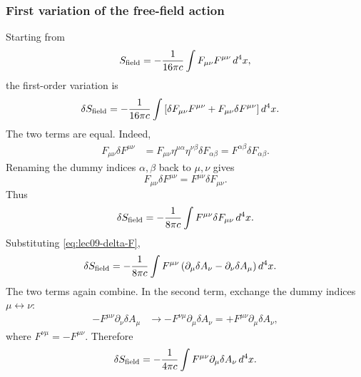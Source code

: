 \subsubsection*{First variation of the free-field action}

Starting from
\begin{equation}\label{eq:lec09-Sf-start}
  S_{\rm field}
  =
  -\frac{1}{16\pi c}\int F_{\mu\nu}F^{\mu\nu}\,d^4x ,
\end{equation}
the first-order variation is
\begin{align}
  \delta S_{\rm field}
  &=
  -\frac{1}{16\pi c}\int
  \left[
    \delta F_{\mu\nu}F^{\mu\nu}
    +F_{\mu\nu}\delta F^{\mu\nu}
  \right]d^4x .
  \label{eq:lec09-dSf-two-terms}
\end{align}
The two terms are equal.  Indeed,
\begin{align}
  F_{\mu\nu}\delta F^{\mu\nu}
  &=
  F_{\mu\nu}\eta^{\mu\alpha}\eta^{\nu\beta}\delta F_{\alpha\beta}
  =
  F^{\alpha\beta}\delta F_{\alpha\beta}.
  \label{eq:lec09-raising-deltaF}
\end{align}
Renaming the dummy indices $\alpha,\beta$ back to $\mu,\nu$ gives
\begin{equation}\label{eq:lec09-two-terms-equal}
  F_{\mu\nu}\delta F^{\mu\nu}=F^{\mu\nu}\delta F_{\mu\nu}.
\end{equation}
Thus
\begin{equation}\label{eq:lec09-dSf-one-term}
  \delta S_{\rm field}
  =
  -\frac{1}{8\pi c}\int F^{\mu\nu}\delta F_{\mu\nu}\,d^4x .
\end{equation}
Substituting \eqref{eq:lec09-delta-F},
\begin{align}
  \delta S_{\rm field}
  &=
  -\frac{1}{8\pi c}\int
  F^{\mu\nu}
  \left(\partial_\mu\delta A_\nu-\partial_\nu\delta A_\mu\right)d^4x .
  \label{eq:lec09-dSf-sub}
\end{align}
The two terms again combine.  In the second term, exchange the dummy indices
$\mu\leftrightarrow\nu$:
\begin{align}
  -F^{\mu\nu}\partial_\nu\delta A_\mu
  &\longrightarrow
  -F^{\nu\mu}\partial_\mu\delta A_\nu
  =
  +F^{\mu\nu}\partial_\mu\delta A_\nu,
  \label{eq:lec09-antisym-combine}
\end{align}
where $F^{\nu\mu}=-F^{\mu\nu}$.  Therefore
\begin{equation}\label{eq:lec09-dSf-before-parts}
  \delta S_{\rm field}
  =
  -\frac{1}{4\pi c}\int
  F^{\mu\nu}\partial_\mu\delta A_\nu\,d^4x .
\end{equation}


